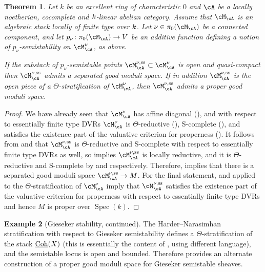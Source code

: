 \documentclass[a4paper]{amsart}
\numberwithin{equation}{section}
\theoremstyle{plain}
\newtheorem{thm}{Theorem}[section]
\theoremstyle{definition}
\newtheorem{ex}[thm]{Example}
\DeclareMathOperator{\Spec}{Spec}
\newcommand{\uCoh}{\underline{{\rm Coh}}}
\newcommand{\co}{\colon}
\renewcommand{\ss}{{\rm ss}}
\def\p{p}
\begin{document}
\begin{thm} \label{T:abelian_semistable_GMS}
Let $k$ be an excellent ring of characteristic $0$ and $\cA$ be a locally noetherian, cocomplete and $k$-linear abelian category. Assume that $\cM_\cA$ is an algebraic stack locally of finite type over $k$.  Let $\nu \in \pi_0(\cM_\cA)$ be a connected component, and let $\p_\nu \co \pi_0(\cM_\cA) \to V$ be an additive function defining a notion of $p_\nu$-semistability on $\cM_\cA^\nu$, as above. 
	
	If the substack of $p_\nu$-semistable points $\cM_\cA^{\nu,\ss} \subset \cM_\cA^\nu$ is open and quasi-compact then $\cM_\cA^{\nu,\ss}$ admits a separated good moduli space. If in addition $\cM_\cA^{\nu,\ss}$ is the open piece of a $\Theta$-stratification of $\cM_\cA^\nu$, then $\cM_{\cA}^{\nu,\ss}$ admits a proper good moduli space.
\end{thm}

\begin{proof}
	We have already seen that $\cM_\cA^\nu$ has affine diagonal (), and with respect to essentially finite type DVRs $\cM_\cA^\nu$ is $\Theta$-reductive (),  {\textsf{S}}-complete (), and satisfies the existence part of the valuative criterion for properness ().  It follows from  and  that $\cM_\cA^{\nu,\ss}$ is $\Theta$-reductive and  {\textsf{S}}-complete with respect to essentially finite type DVRs as well, so  implies $\cM_\cA^{\nu,\ss}$ is locally reductive, and it is $\Theta$-reductive and \textsf{S}-complete by  and  respectively. Therefore,  implies that there is a separated good moduli space $\cM_\cA^{\nu,\ss} \to M$. For the final statement,   and  applied to the $\Theta$-stratification of $\cM_\cA^\nu$ imply that $\cM_\cA^{\nu,\ss}$ satisfies the existence part of the valuative criterion for properness with respect to essentially finite type DVRs and hence $M$ is proper over $\Spec(k)$. 
\end{proof}

\begin{ex}[Gieseker stability, continued] 
The Harder--Narasimhan stratification with respect to Gieseker semistability defines a $\Theta$-stratification of the stack $\uCoh(X)$ (this is essentially the content of \cite{nitsure2011schematic}, using different language), and the semistable locus is open and bounded.  Therefore  provides an alternate construction of a proper good moduli space for Gieseker semistable sheaves.
\end{ex}
\end{document}
